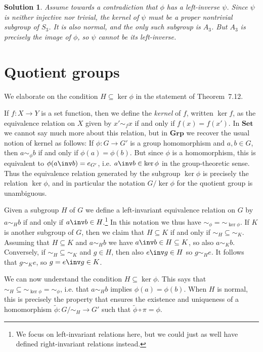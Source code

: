 \documentclass[article, a4paper, 11pt, oneside]{memoir}
\numberwithin{equation}{chapter}
\newcommand{\ncat}[1]{\mathbf{#1}} %
\newcommand{\catSet}{\ncat{Set}} %
\newcommand{\catGrp}{\ncat{Grp}} %
\theoremstyle{nonumberplain}
\newtheorem{solution}{Solution}
\begin{document}
\begin{solution}
    Assume towards a contradiction that $\phi$ has a left-inverse $\psi$. Since $\psi$ is neither injective nor trivial, the kernel of $\psi$ must be a proper nontrivial subgroup of $S_3$. It is also normal, and the only such subgroup is $A_3$. But $A_3$ is precisely the image of $\phi$, so $\psi$ cannot be its left-inverse.
\end{solution}


\section{Quotient groups}

\begin{remark}
    We elaborate on the condition $H \subseteq \ker\phi$ in the statement of Theorem~7.12.

    If $f \colon X \to Y$ is a set function, then we define the \emph{kernel} of $f$, written $\ker f$, as the equivalence relation on $X$ given by $x' \sim_f x$ if and only if $f(x) = f(x')$. In $\catSet$ we cannot say much more about this relation, but in $\catGrp$ we recover the usual notion of kernel as follows: If $\phi \colon G \to G'$ is a group homomorphism and $a,b \in G$, then $a \sim_\phi b$ if and only if $\phi(a) = \phi(b)$. But since $\phi$ is a homomorphism, this is equivalent to $\phi(a\inv b) = e_{G'}$, i.e. $a\inv b \in \ker\phi$ in the group-theoretic sense. Thus the equivalence relation generated by the subgroup $\ker\phi$ is precisely the relation $\ker\phi$, and in particular the notation $G/\ker\phi$ for the quotient group is unambiguous.

    Given a subgroup $H$ of $G$ we define a left-invariant equivalence relation on $G$ by $a \sim_H b$ if and only if $a\inv b \in H$.\footnote{We focus on left-invariant relations here, but we could just as well have defined right-invariant relations instead.} In this notation we thus have ${\sim_\phi} = {\sim_{\ker\phi}}$. If $K$ is another subgroup of $G$, then we claim that $H \subseteq K$ if and only if ${\sim_H} \subseteq {\sim_K}$. Assuming that $H \subseteq K$ and $a \sim_H b$ we have $a\inv b \in H \subseteq K$, so also $a \sim_K b$. Conversely, if ${\sim_H} \subseteq {\sim_K}$ and $g \in H$, then also $e\inv g \in H$ so $g \sim_H e$. It follows that $g \sim_K e$, so $g = e\inv g \in K$.

    We can now understand the condition $H \subseteq \ker\phi$. This says that ${\sim_H} \subseteq {\sim_{\ker\phi}} = {\sim_\phi}$, i.e. that $a \sim_H b$ implies $\phi(a) = \phi(b)$. When $H$ is normal, this is precisely the property that ensures the existence and uniqueness of a homomorphism $\tilde\phi \colon G/{\sim_H} \to G'$ such that $\tilde\phi \circ \pi = \phi$.
\end{remark}
\end{document}
